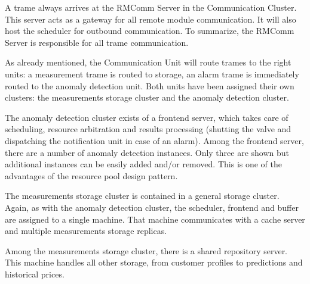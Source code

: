 \npar A trame always arrives at the RMComm Server in the Communication Cluster.
This server acts as a gateway for all remote module communication. It will also
host the scheduler for outbound communication. To summarize, the RMComm Server
is responsible for all trame communication. 

\npar As already mentioned, the Communication Unit will route trames to the
right units: a measurement trame is routed to storage, an alarm trame is
immediately routed to the anomaly detection unit. Both units have been assigned
their own clusters: the measurements storage cluster and the anomaly detection
cluster. 

\npar The anomaly detection cluster exists of a frontend server, which takes
care of scheduling, resource arbitration and results processing
(shutting the valve and dispatching the notification unit in case of an alarm).
Among the frontend server, there are a number of anomaly detection instances.
Only three are shown but additional instances can be easily added and/or
removed. This is one of the advantages of the resource pool design pattern.

\npar The measurements storage cluster is contained in a general storage
cluster. Again, as with the anomaly detection cluster, the scheduler, frontend
and buffer are assigned to a single machine. That machine communicates with a
cache server and multiple measurements storage replicas. 

\npar Among the measurements storage cluster, there is a shared repository
server. This machine handles all other storage, from customer profiles to
predictions and historical prices. 

\npar 








